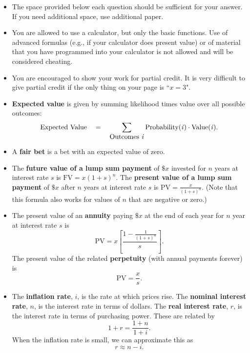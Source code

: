 \documentclass{article}
\begin{document}
\begin{EXAM}

\begin{itemize} 

\item The space provided below each question should be sufficient
for your answer. If you need additional space, use additional
paper.

\item You are allowed to use a calculator, but only the basic
functions. Use of advanced formulas (e.g., if your calculator does
present value) or of material that you have programmed into your
calculator is not allowed and will be considered cheating.

\item You are encouraged to show your work for partial credit. It
is very difficult to give partial credit if the only thing on your
page is ``$x=3$".

\item \textbf{Expected value} is given by summing likelihood times value over all possible outcomes: 
\[
\mbox{Expected Value}\ \ \  = \ \ \ \sum_{\mbox{Outcomes \emph{i}}} \mbox{Probability(\emph{i})} \cdot \mbox{Value(\emph{i})}.
\]


\item A \textbf{fair bet} is a bet with an expected value of zero.

\item The \textbf{future value of a lump sum payment} of $\$x$ invested for $n$ years at interest rate $s$ is $\displaystyle \mbox{FV} = x(1+s)^{n}$. The \textbf{present value of a lump sum payment} of $\$x$ after $n$ years at interest rate $s$ is $\displaystyle \mbox{PV} = \frac{x}{(1+s)^{n}}.$ (Note that this formula also works for values of $n$ that are negative or zero.) 

\item The present value of an \textbf{annuity} paying $\$x$ at the end of each year for $n$ year at interest rate $s$ is  
\[
\mbox{PV}=x\left[ \frac{1 - \displaystyle\frac{1}{(1+s)^n}}{s}\right].
\]
The present value of the related \textbf{perpetuity} (with annual payments forever) is
\[
\mbox{PV}=\frac{x}{s}.
\]

\item The \textbf{inflation rate}, $i$, is the rate at which prices rise. The \textbf{nominal interest rate}, $n$, is the interest rate in terms of dollars. The \textbf{real interest rate}, $r$, is the interest rate in terms of purchasing power. These are related by
\[
1+r=\frac{1+n}{1+i}.
\]
When the inflation rate is small, we can approximate this as
\[
r \approx n-i.
\]



\end{itemize}
\end{EXAM}
\end{document}

